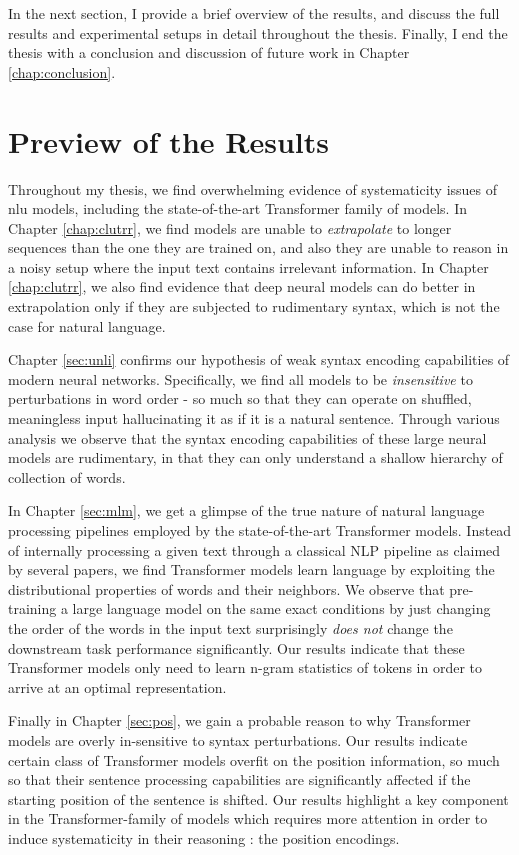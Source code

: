 \documentclass[letterpaper, 12pt]{report}
\begin{document}
In the next section, I provide a brief overview of the results, and discuss the full results and experimental setups in detail throughout the thesis. Finally, I end the thesis with a conclusion and discussion of future work in Chapter \autoref{chap:conclusion}.

\section{Preview of the Results}

Throughout my thesis, we find overwhelming evidence of systematicity issues of \acrshort{nlu} models, including the state-of-the-art Transformer family of models. In Chapter \autoref{chap:clutrr}, we find models are unable to \textit{extrapolate} to longer sequences than the one they are trained on, and also they are unable to reason in a noisy setup where the input text contains irrelevant information. In Chapter \autoref{chap:clutrr}, we also find evidence that deep neural models can do better in extrapolation only if they are subjected to rudimentary syntax, which is not the case for natural language.

Chapter \autoref{sec:unli} confirms our hypothesis of weak syntax encoding capabilities of modern neural networks. Specifically, we find all models to be \textit{insensitive} to perturbations in word order - so much so that they can operate on shuffled, meaningless input hallucinating it as if it is a natural sentence. Through various analysis we observe that the syntax encoding capabilities of these large neural models are rudimentary, in that they can only understand a shallow hierarchy of collection of words.

In Chapter \autoref{sec:mlm}, we get a glimpse of the true nature of natural language processing pipelines employed by the state-of-the-art Transformer models. Instead of internally processing a given text through a classical NLP pipeline as claimed by several papers, we find Transformer models learn language by exploiting the distributional properties of words and their neighbors. We observe that pre-training a large language model on the same exact conditions by just changing the order of the words in the input text surprisingly \textit{does not} change the downstream task performance significantly. Our results indicate that these Transformer models only need to learn n-gram statistics of tokens in order to arrive at an optimal representation.

Finally in Chapter \autoref{sec:pos}, we gain a probable reason to why Transformer models are overly in-sensitive to syntax perturbations. Our results indicate certain class of Transformer models overfit on the position information, so much so that their sentence processing capabilities are significantly affected if the starting position of the sentence is shifted. Our results highlight a key component in the Transformer-family of models which requires more attention in order to induce systematicity in their reasoning : the position encodings.
\end{document}
